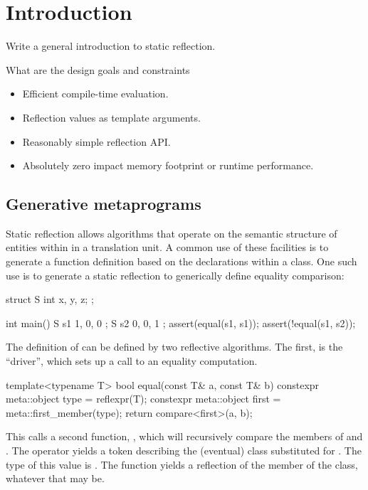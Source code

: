 \chapter{Introduction}

Write a general introduction to static reflection.

What are the design goals and constraints
\begin{itemize}
\item Efficient compile-time evaluation.
\item Reflection values as template arguments.
\item Reasonably simple reflection API.
\item Absolutely zero impact memory footprint or runtime performance.
\end{itemize}

\section{Generative metaprograms}

Static reflection allows algorithms that operate on the semantic structure of entities within in a translation unit. 
A common use of these facilities is to generate a function definition based on the declarations within a class.
One such use is to generate a static reflection to generically define equality comparison: 

\begin{codeblock}
struct S { 
  int x, y, z;
}; 
 
int main() { 
 S s1 { 1, 0, 0 };
 S s2 { 0, 0, 1 };
 assert(equal(s1, s1));
 assert(!equal(s1, s2));
}
\end{codeblock}

The definition of  can be defined by two reflective algorithms. The first, is the ``driver'', which sets up a call to an equality computation.

\begin{codeblock}
template<typename T> 
bool equal(const T& a, const T& b) {
  constexpr meta::object type = reflexpr(T);
  constexpr meta::object first = meta::first_member(type);
  return compare<first>(a, b);
}
\end{codeblock}

This calls a second function, , which will recursively compare the members of  and . 
The  operator yields a token describing the (eventual) class substituted for . 
The type of this value is . 
The  function yields a reflection of the member of the class, whatever that may be.

